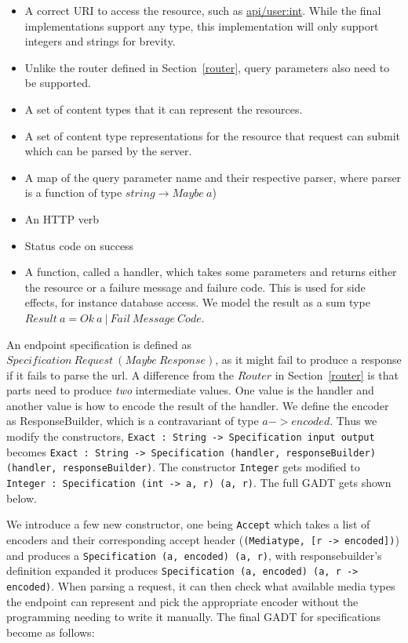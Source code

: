 \begin{itemize}
    \item A correct URI to access the resource, such as \url{api/user:int}.
        While the final implementations support any type, this implementation
        will only support integers and strings for brevity.
    \item Unlike the router defined in Section~\ref{router}, query parameters
        also need to be supported.
    \item A set of content types that it can represent the resources.
    \item A set of content type representations for the resource that request can
        submit which can be parsed by the server.
    \item A map of the query parameter name and their respective parser,
        where parser is a function of type $string \rightarrow Maybe\ a$)
    \item An HTTP verb
    \item Status code on success
    \item A function, called a handler, which takes some parameters and returns
        either the resource or a failure message and failure code. This is used
        for side effects, for instance database access. We model the result as
        a sum type $Result\ a = Ok\ a\ |\ Fail\ Message\ Code$.
\end{itemize}

An endpoint specification is defined as $Specification\ Request\ (Maybe\
Response)$, as it might fail to produce a response if it fails to parse the url.
A difference from the $Router$ in Section~\ref{router} is that parts need to
produce \textit{two} intermediate values.  One value is the handler and another
value is how to encode the result of the handler. We define the encoder as
ResponseBuilder, which is a contravariant of type $a -> encoded$.  Thus we
modify the constructors, \texttt{Exact : String -> Specification input output}
becomes \texttt{Exact : String -> Specification (handler, responseBuilder)
(handler, responseBuilder)}. The constructor \texttt{Integer} gets modified to
\texttt{Integer : Specification (int -> a, r) (a, r)}. The full GADT gets shown
below.

We introduce a few new constructor, one being \texttt{Accept} which takes a list
of encoders and their corresponding accept header (\texttt{(Mediatype, [r ->
encoded])}) and produces a \texttt{Specification (a, encoded) (a, r)},
with responsebuilder's definition expanded it produces \texttt{Specification
(a, encoded) (a, r -> encoded)}. When parsing a request, it can
then check what available media types the endpoint can represent and pick
the appropriate encoder without the programming needing to write it
manually. The final GADT for specifications become as follows:


